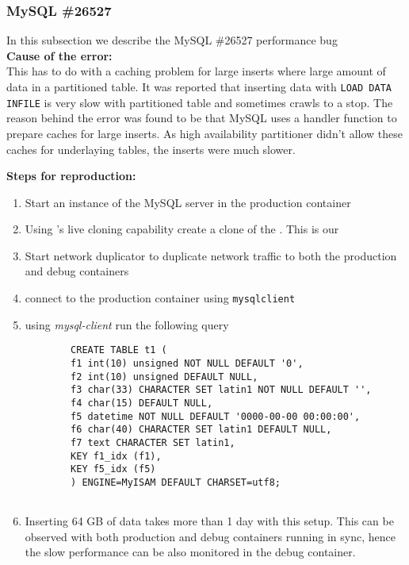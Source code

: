 \subsubsection{MySQL \#26527}

In this subsection we describe the MySQL \#26527 performance bug \\

\noindent \textbf{Cause of the error:} \\

This has to do with a caching problem for large inserts where large amount of data in a partitioned table.
It was reported that inserting data with \texttt{LOAD DATA INFILE} is very slow with partitioned table and sometimes crawls to a stop.
The reason behind the error was found to be that MySQL uses a handler function to prepare caches for large inserts.
As high availability partitioner didn't allow these caches for underlaying tables, the inserts were much slower.

\noindent \textbf{Steps for reproduction:} \\

\begin{adjustwidth}{0.5cm}{}
	\begin{enumerate}
		\item Start an instance of the MySQL server in the production container
		\item Using \parikshan's live cloning capability create a clone of the \productioncontainer. This is our \debugcontainer
		\item Start network duplicator to duplicate network traffic to both the production and debug containers
		\item connect to the production container using \texttt{mysqlclient}
		\item using \emph{mysql-client} run the following query
		
		\begin{lstlisting}
		CREATE TABLE t1 (
		f1 int(10) unsigned NOT NULL DEFAULT '0',
		f2 int(10) unsigned DEFAULT NULL,
		f3 char(33) CHARACTER SET latin1 NOT NULL DEFAULT '',
		f4 char(15) DEFAULT NULL,
		f5 datetime NOT NULL DEFAULT '0000-00-00 00:00:00',
		f6 char(40) CHARACTER SET latin1 DEFAULT NULL,
		f7 text CHARACTER SET latin1,
		KEY f1_idx (f1),
		KEY f5_idx (f5)
		) ENGINE=MyISAM DEFAULT CHARSET=utf8;
		
		\end{lstlisting}
		
		\item Inserting 64 GB of data takes more than 1 day with this setup. This can be observed with both production and debug containers running in sync, hence the slow performance can be also monitored in the debug container.
		
	\end{enumerate}
\end{adjustwidth}	


